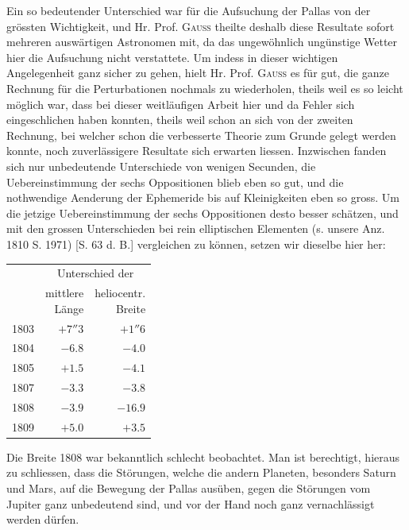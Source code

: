 \par\indent Ein so bedeutender Unterschied war für die Aufsuchung der Pallas von der grössten Wichtigkeit, und Hr. Prof. \textsc{Gauss} theilte deshalb diese Resultate sofort mehreren auswärtigen Astronomen mit, da das ungewöhnlich ungünstige Wetter hier die Aufsuchung nicht verstattete. Um indess in dieser wichtigen Angelegenheit ganz sicher zu gehen, hielt Hr. Prof. \textsc{Gauss} es für gut, die ganze Rechnung für die Perturbationen nochmals zu wiederholen, theils weil es so leicht möglich war, dass bei dieser weitläufigen Arbeit hier und da Fehler sich eingeschlichen haben konnten, theils weil schon an sich von der zweiten Rechnung, bei welcher schon die verbesserte Theorie zum Grunde gelegt werden konnte, noch zuverlässigere Resultate sich erwarten liessen. Inzwischen fanden sich nur unbedeutende Unterschiede von wenigen Secunden, die Uebereinstimmung der sechs Oppositionen blieb eben so gut, und die nothwendige Aenderung der Ephemeride bis auf Kleinigkeiten eben so gross. Um die jetzige Uebereinstimmung der sechs Oppositionen desto besser schätzen, und mit den grossen Unterschieden bei rein elliptischen Elementen (s. unsere Anz. 1810 S. 1971) [S. 63 d. B.] vergleichen zu können, setzen wir dieselbe hier her:
\begin{center}\fontsize{10}{12}\selectfont\setlength{\tabcolsep}{4pt}\renewcommand{\arraystretch}{1.15}\begin{tabular}{r|r|r}
 & \multicolumn{2}{c}{Unterschied der}\\
 & \shortstack{mittlere\\Länge} & \shortstack{heliocentr.\\Breite}\\\hline
1803 & $+7''3$ & $+1''6$\\
1804 & $-6.8$ & $-4.0$\\
1805 & $+1.5$ & $-4.1$\\
1807 & $-3.3$ & $-3.8$\\
1808 & $-3.9$ & $-16.9$\\
1809 & $+5.0$ & $+3.5$\\
\end{tabular}\end{center}

\par\indent Die Breite 1808 war bekanntlich schlecht beobachtet. Man ist berechtigt, hieraus zu schliessen, dass die Störungen, welche die andern Planeten, besonders Saturn und Mars, auf die Bewegung der Pallas ausüben, gegen die Störungen vom Jupiter ganz unbedeutend sind, und vor der Hand noch ganz vernachlässigt werden dürfen.

